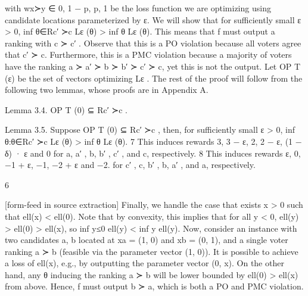 \documentclass[10pt]{article}
\begin{document}
\begin{ReviewVerbatim}
with wx≻y ∈ {0, 1 − p, p, 1} be the loss function we are optimizing using candidate locations
parameterized by ε.
We will show that for sufficiently small ε > 0, inf θ∈Rc′ ≻c Lε (θ) > inf θ Lε (θ). This means that
f must output a ranking with c ≻ c′ . Observe that this is a PO violation because all voters agree
that c′ ≻ c. Furthermore, this is a PMC violation because a majority of voters have the ranking
a ≻ a′ ≻ b ≻ b′ ≻ c′ ≻ c, yet this is not the output.
Let OP T (ε) be the set of vectors optimizing Lε . The rest of the proof will follow from the following
two lemmas, whose proofs are in Appendix A.

Lemma 3.4. OP T (0) ⊆ Rc′ ≻c .

Lemma 3.5. Suppose OP T (0) ⊆ Rc′ ≻c , then, for sufficiently small ε > 0, inf θ:θ∈Rc′ ≻c Lε (θ) >
inf θ Lε (θ).
   7
       This induces rewards 3, 3 − ε, 2, 2 − ε, (1 − δ) · ε and 0 for a, a′ , b, b′ , c′ , and c, respectively.
   8
       This induces rewards ε, 0, −1 + ε, −1, −2 + ε and −2. for c′ , c, b′ , b, a′ , and a, respectively.


                                                              6

[form-feed in source extraction]
Finally, we handle the case that exists x > 0 such that ell(x) < ell(0). Note that by convexity, this
implies that for all y < 0, ell(y) > ell(0) > ell(x), so inf y≤0 ell(y) < inf y ell(y). Now, consider an
instance with two candidates {a, b} located at xa = (1, 0) and xb = (0, 1), and a single voter
ranking a ≻ b (feasible via the parameter vector (1, 0)). It is possible to achieve a loss of ell(x), e.g.,
by outputting the parameter vector (0, x). On the other hand, any θ inducing the ranking a ≻ b will
be lower bounded by ell(0) > ell(x) from above. Hence, f must output b ≻ a, which is both a PO and
PMC violation.
\end{ReviewVerbatim}
\end{document}
